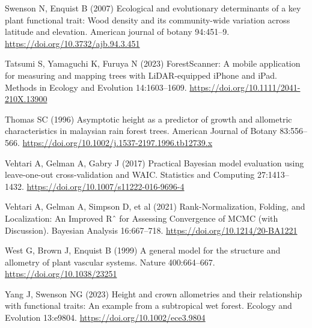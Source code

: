 \documentclass[
  12pt,
  letterpaper,
  DIV=11,
  numbers=noendperiod]{scrartcl}
\newlength{\cslhangindent}
\newlength{\cslentryspacingunit} %
\newenvironment{CSLReferences}[2] %
 {%
  \setlength{\parindent}{0pt}
  \ifodd #1
  \let\oldpar\par
  \def\par{\hangindent=\cslhangindent\oldpar}
  \fi
  \setlength{\parskip}{#2\cslentryspacingunit}
 }%
 {}
\begin{document}
\begin{CSLReferences}{1}{0}
\leavevmode{}%
Swenson N, Enquist B (2007) Ecological and evolutionary determinants of
a key plant functional trait: {Wood} density and its community-wide
variation across latitude and elevation. American journal of botany
94:451--9. \url{https://doi.org/10.3732/ajb.94.3.451}

\leavevmode{}%
Tatsumi S, Yamaguchi K, Furuya N (2023) {ForestScanner}: {A} mobile
application for measuring and mapping trees with {LiDAR}-equipped
{iPhone} and {iPad}. Methods in Ecology and Evolution 14:1603--1609.
\url{https://doi.org/10.1111/2041-210X.13900}

\leavevmode{}%
Thomas SC (1996) Asymptotic height as a predictor of growth and
allometric characteristics in malaysian rain forest trees. American
Journal of Botany 83:556--566.
\url{https://doi.org/10.1002/j.1537-2197.1996.tb12739.x}

\leavevmode{}%
Vehtari A, Gelman A, Gabry J (2017) Practical {Bayesian} model
evaluation using leave-one-out cross-validation and {WAIC}. Statistics
and Computing 27:1413--1432.
\url{https://doi.org/10.1007/s11222-016-9696-4}

\leavevmode{}%
Vehtari A, Gelman A, Simpson D, et al (2021) Rank-{Normalization},
{Folding}, and {Localization}: {An} {Improved} {Rˆ} for {Assessing}
{Convergence} of {MCMC} (with {Discussion}). Bayesian Analysis
16:667--718. \url{https://doi.org/10.1214/20-BA1221}

\leavevmode{}%
West G, Brown J, Enquist B (1999) A general model for the structure and
allometry of plant vascular systems. Nature 400:664--667.
\url{https://doi.org/10.1038/23251}

\leavevmode{}%
Yang J, Swenson NG (2023) Height and crown allometries and their
relationship with functional traits: {An} example from a subtropical wet
forest. Ecology and Evolution 13:e9804.
\url{https://doi.org/10.1002/ece3.9804}

\end{CSLReferences}
\end{document}
